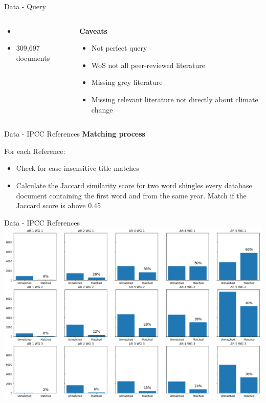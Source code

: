 \documentclass[9pt]{beamer}
\begin{document}
\begin{frame}{Data - Query}
\begin{columns}
\begin{column}{0.65\linewidth}
		\normalsize
		\begin{itemize}
			\item \citep{Haunschild2016}
			\item 309,697 documents
		\end{itemize}
	\end{column}
	\begin{column}{0.35\linewidth}
		\textbf{Caveats}
		\begin{itemize}
			\item Not perfect query
			\item WoS not all peer-reviewed literature
			\item Missing grey literature
			\item Missing relevant literature not directly about climate change
		\end{itemize}
	\end{column}
\end{columns}
\end{frame}

\begin{frame}{Data - IPCC References}
	\textbf{Matching process}
	
	\medskip
	
	For each Reference:
	\begin{itemize}
		\item Check for case-insensitive title matches
		\item Calculate the Jaccard similarity score for two word shingles every database document containing the first word and from the same year. Match if the Jaccard score is above 0.45
	\end{itemize}
\end{frame}


\begin{frame}{Data - IPCC References}
		\includegraphics[width=\linewidth]{../plots/ipcc_matches}
\end{frame}
\end{document}
